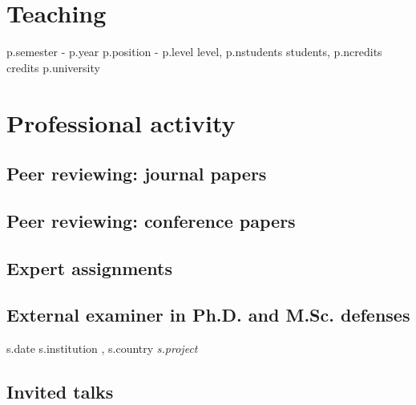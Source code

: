 \documentclass[10pt,letterpaper]{article} %
\begin{document}
{{{{{{{{{{{{{{\section*{Teaching}

{%
    { {{ p.semester }} - {{ p.year }}  }
    { {{ p.position }}  - {{ p.level }} level, {{ p.nstudents }} students, {{ p.ncredits }} credits }
    { {{ p.university }}  }
    {} {%



\section*{Professional activity}

\subsection*{Peer reviewing: journal papers}

{%

\subsection*{Peer reviewing: conference papers}

{%

\subsection*{Expert assignments}

{%

\subsection*{External examiner in Ph.D. and M.Sc. defenses}

{%
    { {{ s.date }} }
    {  }
    { {{ s.institution }}, {{ s.country }} }
    { {\it {{ s.project }} } }
{%


\subsection*{Invited talks}

}}}}}}}}}}}}}}}}}}}}}
\end{document}

